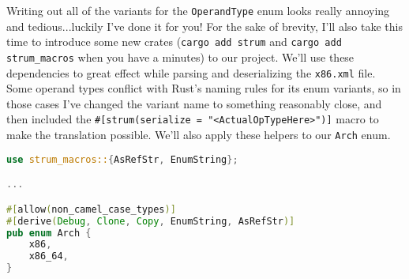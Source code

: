 Writing out all of the variants for the \texttt{OperandType} enum looks really
annoying and tedious...luckily I've done it for you! For the sake of brevity,
I'll also take this time to introduce some new crates (\texttt{cargo add strum} 
and \texttt{cargo add strum\_macros} when you have a minutes) to our project. We'll
use these dependencies to great effect while parsing and deserializing the \texttt{x86.xml}
file. Some operand types conflict with Rust's naming rules for its enum variants,
so in those cases I've changed the variant name to something reasonably close,
and then included the \texttt{\#[strum(serialize = "<ActualOpTypeHere>")]} macro
to make the translation possible. We'll also apply these helpers to our 
\texttt{Arch} enum.

\begin{lstlisting}[language=rust]
use strum_macros::{AsRefStr, EnumString};

...

#[allow(non_camel_case_types)]
#[derive(Debug, Clone, Copy, EnumString, AsRefStr)]
pub enum Arch {
    x86,
    x86_64,
}


\end{lstlisting}
